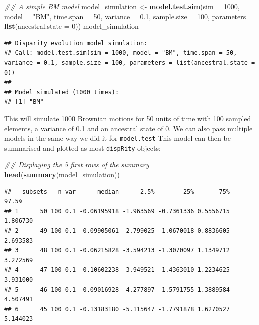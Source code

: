 \documentclass[]{book}
\newenvironment{Shaded}{\begin{snugshade}}{\end{snugshade}}
\newcommand{\CommentTok}[1]{\textcolor[rgb]{0.56,0.35,0.01}{\textit{#1}}}
\newcommand{\DataTypeTok}[1]{\textcolor[rgb]{0.13,0.29,0.53}{#1}}
\newcommand{\DecValTok}[1]{\textcolor[rgb]{0.00,0.00,0.81}{#1}}
\newcommand{\FloatTok}[1]{\textcolor[rgb]{0.00,0.00,0.81}{#1}}
\newcommand{\KeywordTok}[1]{\textcolor[rgb]{0.13,0.29,0.53}{\textbf{#1}}}
\newcommand{\NormalTok}[1]{#1}
\newcommand{\StringTok}[1]{\textcolor[rgb]{0.31,0.60,0.02}{#1}}
\begin{document}
\begin{Shaded}
\begin{Highlighting}[]
\CommentTok{## A simple BM model}
\NormalTok{model_simulation <-}\StringTok{ }\KeywordTok{model.test.sim}\NormalTok{(}\DataTypeTok{sim =} \DecValTok{1000}\NormalTok{, }\DataTypeTok{model =} \StringTok{"BM"}\NormalTok{,}
                                   \DataTypeTok{time.span =} \DecValTok{50}\NormalTok{, }\DataTypeTok{variance =} \FloatTok{0.1}\NormalTok{,}
                                   \DataTypeTok{sample.size =} \DecValTok{100}\NormalTok{,}
                                   \DataTypeTok{parameters =} \KeywordTok{list}\NormalTok{(}\DataTypeTok{ancestral.state =} \DecValTok{0}\NormalTok{))}
\NormalTok{model_simulation}
\end{Highlighting}
\end{Shaded}

\begin{verbatim}
## Disparity evolution model simulation:
## Call: model.test.sim(sim = 1000, model = "BM", time.span = 50, variance = 0.1, sample.size = 100, parameters = list(ancestral.state = 0)) 
## 
## Model simulated (1000 times):
## [1] "BM"
\end{verbatim}

This will simulate 1000 Brownian motions for 50 units of time with 100 sampled elements, a variance of 0.1 and an ancestral state of 0.
We can also pass multiple models in the same way we did it for \texttt{model.test}
This model can then be summarised and plotted as most \texttt{dispRity} objects:

\begin{Shaded}
\begin{Highlighting}[]
\CommentTok{## Displaying the 5 first rows of the summary}
\KeywordTok{head}\NormalTok{(}\KeywordTok{summary}\NormalTok{(model_simulation))}
\end{Highlighting}
\end{Shaded}

\begin{verbatim}
##   subsets   n var      median      2.5%        25%       75%    97.5%
## 1      50 100 0.1 -0.06195918 -1.963569 -0.7361336 0.5556715 1.806730
## 2      49 100 0.1 -0.09905061 -2.799025 -1.0670018 0.8836605 2.693583
## 3      48 100 0.1 -0.06215828 -3.594213 -1.3070097 1.1349712 3.272569
## 4      47 100 0.1 -0.10602238 -3.949521 -1.4363010 1.2234625 3.931000
## 5      46 100 0.1 -0.09016928 -4.277897 -1.5791755 1.3889584 4.507491
## 6      45 100 0.1 -0.13183180 -5.115647 -1.7791878 1.6270527 5.144023
\end{verbatim}
\end{document}
